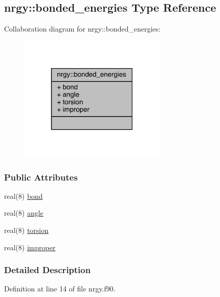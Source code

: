 \hypertarget{structnrgy_1_1bonded__energies}{\subsection{nrgy\-:\-:bonded\-\_\-energies Type Reference}
\label{structnrgy_1_1bonded__energies}
}


Collaboration diagram for nrgy\-:\-:bonded\-\_\-energies\-:
\nopagebreak
\begin{figure}[H]
\begin{center}
\leavevmode
\includegraphics[width=199pt]{structnrgy_1_1bonded__energies__coll__graph}
\end{center}
\end{figure}
\subsubsection*{Public Attributes}
\begin{DoxyCompactItemize}
\item 
real(8) \hyperlink{structnrgy_1_1bonded__energies_a6991660ad80264db6f036dc9a2264f15}{bond}
\item 
real(8) \hyperlink{structnrgy_1_1bonded__energies_aec4a2f71dff343dff4a3be24b726a6cd}{angle}
\item 
real(8) \hyperlink{structnrgy_1_1bonded__energies_a847f033a2b0af8384a399a1740900d44}{torsion}
\item 
real(8) \hyperlink{structnrgy_1_1bonded__energies_aa3325a98d7f6ad228c447d75e969d37d}{improper}
\end{DoxyCompactItemize}


\subsubsection{Detailed Description}


Definition at line 14 of file nrgy.\-f90.



